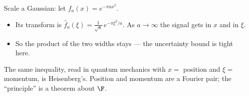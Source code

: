 \begin{yourturn}
Scale a Gaussian: let $f_a(x)=e^{-\pi a x^2}$.
\begin{itemize}[leftmargin=1.3em,itemsep=1pt]
  \item Its transform is $\widehat f_a(\xi)=\tfrac{1}{\sqrt a}\,e^{-\pi\xi^2/a}$. As $a\to\infty$ the
        signal gets \fillin[2cm] in $x$ and \fillin[2cm] in $\xi$.
  \item So the product of the two widths stays \fillin[2.5cm] — the uncertainty bound is tight here.
\end{itemize}
\end{yourturn}

\begin{strand}
The same inequality, read in quantum mechanics with $x=$ position and $\xi=$ momentum, is
Heisenberg's. Position and momentum are a Fourier pair; the ``principle'' is a theorem about $\F$.
\end{strand}
